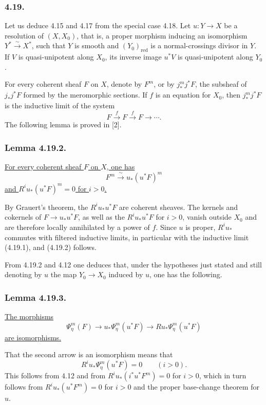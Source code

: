 \subsubsection*{4.19.}
Let us deduce 4.15 and 4.17 from the special case 4.18.  Let
$u:Y\longrightarrow X$ be a resolution of $(X,X_0)$, that is, a
proper morphism inducing an isomorphism
$Y^*\xrightarrow{\ \sim\ }X^*$, such that $Y$ is smooth and
$(Y_0)_{\mathrm{red}}$ is a normal-crossings divisor in $Y$.  If $V$
is quasi-unipotent along $X_0$, its inverse image $u^*V$ is
quasi-unipotent along $Y_0$.

For every coherent sheaf $F$ on $X$, denote by $F^m$, or by
$j_*^m j^*F$, the subsheaf of $j_*j^*F$ formed by the meromorphic
sections.  If $f$ is an equation for $X_0$, then $j_*^m j^*F$ is the
inductive limit of the system
\begin{equation}\tag{4.19.1}
F\xrightarrow{f}F\xrightarrow{f}F\longrightarrow\cdots.
\end{equation}
The following lemma is proved in [2].

\subsubsection*{Lemma 4.19.2.}
\underline{For every coherent sheaf $F$ on $X$, one has}
\[
F^m\xrightarrow{\ \sim\ }u_*(u^*F)^m
\]
\underline{and $R^iu_*(u^*F)^m=0$ for $i>0$.}

By Grauert's theorem, the $R^iu_*u^*F$ are coherent sheaves.  The
kernels and cokernels of $F\longrightarrow u_*u^*F$, as well as the
$R^iu_*u^*F$ for $i>0$, vanish outside $X_0$ and are therefore
locally annihilated by a power of $f$.  Since $u$ is proper,
$R^iu_*$ commutes with filtered inductive limits, in particular with
the inductive limit (4.19.1), and (4.19.2) follows.

From 4.19.2 and 4.12 one deduces that, under the hypotheses just
stated and still denoting by $u$ the map $Y_0\to X_0$ induced by
$u$, one has the following.

\subsubsection*{Lemma 4.19.3.}
\underline{The morphisms}
\[
\Psi_\eta^m(F)\longrightarrow
u_*\Psi_\eta^m(u^*F)\longrightarrow
Ru_*\Psi_\eta^m(u^*F)
\]
\underline{are isomorphisms.}

That the second arrow is an isomorphism means that
\[
R^iu_*\Psi_\eta^m(u^*F)=0\qquad(i>0).
\]
This follows from 4.12 and from
$R^iu_*(i^*u^*F^m)=0$ for $i>0$, which in turn follows from
$R^iu_*(u^*F^m)=0$ for $i>0$ and the proper base-change theorem for
$u$.

